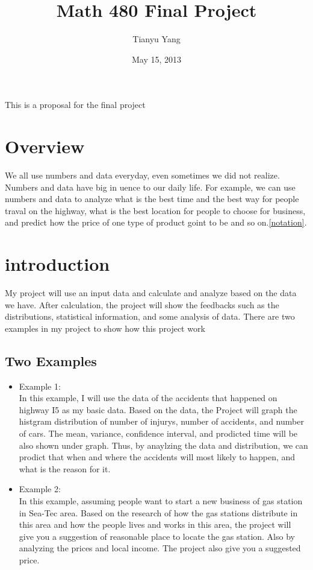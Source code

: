 \documentclass{article}
\title{Math 480 Final Project}
\author{Tianyu Yang}
\date{May 15, 2013}
\begin{document}
\maketitle  This is a proposal for the final project

\section{Overview}

We all use numbers and data everyday, even sometimes we did not realize.
Numbers and data have big in
uence to our daily life. For example, we can
use numbers and data to analyze what is the best time and the best way for
people traval on the highway, what is the best location for people to choose for
business, and predict how the price of one type of product goint to be and so
on.\ref{notation}.

\section{introduction}
My project will use an input data and calculate and analyze based on the data
we have. After calculation, the project will show the feedbacks such as the
distributions, statistical information, and some analysis of data. There are two
examples in my project to show how this project work

\subsection{Two Examples}\label{example}
\begin{itemize}   %
   \item Example 1:\\
   In this example, I will use the data of the accidents that happened on
highway I5 as my basic data. Based on the data, the Project will graph
the histgram distribution of number of injurys, number of accidents, and
number of cars. The mean, variance, confidence interval, and prodicted
time will be also shown under graph. Thus, by anaylzing the data and
distribution, we can prodict that when and where the accidents will most
likely to happen, and what is the reason for it.

   \item Example 2:\\
   In this example, assuming people want to start a new business of gas
station in Sea-Tec area. Based on the research of how the gas stations
distribute in this area and how the people lives and works in this area,
the project will give you a suggestion of reasonable place to locate the gas
station. Also by analyzing the prices and local income. The project also
give you a suggested price.
\end{itemize}
\end{document}
